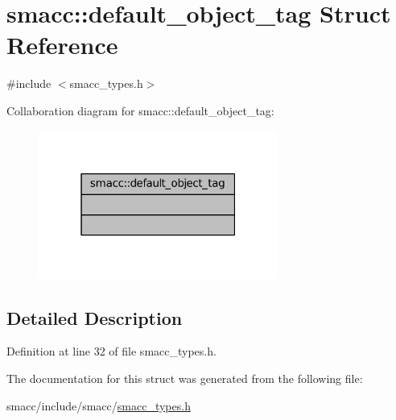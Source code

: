 \hypertarget{structsmacc_1_1default__object__tag}{}\section{smacc\+:\+:default\+\_\+object\+\_\+tag Struct Reference}
\label{structsmacc_1_1default__object__tag}


{\ttfamily \#include $<$smacc\+\_\+types.\+h$>$}



Collaboration diagram for smacc\+:\+:default\+\_\+object\+\_\+tag\+:
\nopagebreak
\begin{figure}[H]
\begin{center}
\leavevmode
\includegraphics[width=223pt]{structsmacc_1_1default__object__tag__coll__graph}
\end{center}
\end{figure}


\subsection{Detailed Description}


Definition at line 32 of file smacc\+\_\+types.\+h.



The documentation for this struct was generated from the following file\+:\begin{DoxyCompactItemize}
\item 
smacc/include/smacc/\hyperlink{smacc__types_8h}{smacc\+\_\+types.\+h}\end{DoxyCompactItemize}
